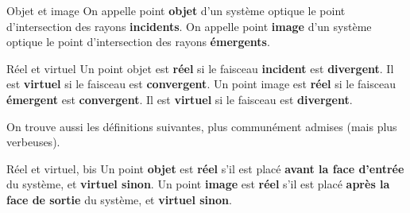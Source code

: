 \documentclass[../main/main.tex]{subfiles}
\begin{document}
\begin{defi}[label=def:objimg, sidebyside]{Objet et image}
    On appelle point \textbf{objet} d'un système optique le point d'intersection
    des rayons \textbf{incidents}.
    \tcblower
    On appelle point \textbf{image} d'un système optique le point d'intersection
    des rayons \textbf{émergents}.
\end{defi}

\begin{defi}[label=reelvirt, sidebyside]{Réel et virtuel}
    Un point objet est \textbf{réel} si le faisceau \textbf{incident} est
    \textbf{divergent}. Il est \textbf{virtuel} si le faisceau est
    \textbf{convergent}.
    \tcblower
    Un point image est \textbf{réel} si le faisceau \textbf{émergent} est
    \textbf{convergent}. Il est \textbf{virtuel} si le faisceau est
    \textbf{divergent}.
\end{defi}

On trouve aussi les définitions suivantes, plus communément admises (mais plus
verbeuses).

\begin{defi}[label=reelvirt2, sidebyside]{{Réel et virtuel, bis}}
    Un point \textbf{objet} est \textbf{réel} s'il est placé \textbf{avant la
    face d'entrée} du système, et \textbf{virtuel sinon}.
    \tcblower
    Un point \textbf{image} est \textbf{réel} s'il est placé \textbf{après la
    face de sortie} du système, et \textbf{virtuel sinon}.
\end{defi}
\end{document}
